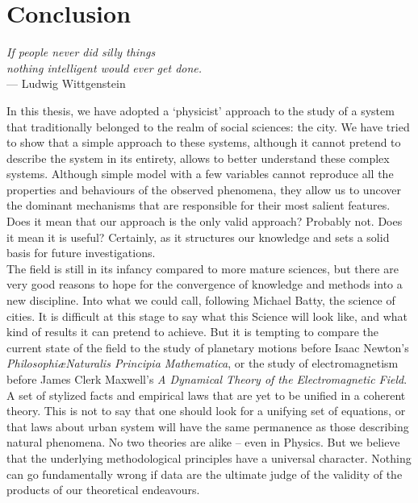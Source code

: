 %
\chapter{Conclusion}
\label{sec:conclusion}

\begin{flushright}{\slshape    
If people never did silly things\\
nothing intelligent would ever get done.} \\ \medskip
--- Ludwig Wittgenstein~\cite{Luckhardt:1979}
\end{flushright}

\bigskip

In this thesis, we have adopted a `physicist' approach to the study of a system
that traditionally belonged to the realm of social sciences: the city. We have
tried to show that a simple approach to these systems, although it cannot
pretend to describe the system in its entirety, allows to better understand
these complex systems. Although simple model with a few variables cannot
reproduce all the properties and behaviours of the observed phenomena, they
allow us to uncover the dominant mechanisms that are responsible for their most
salient features. Does it mean that our approach is the only valid approach?
Probably not. Does it mean it is useful? Certainly, as it structures
our knowledge and sets a solid basis for future investigations.\\

The field is still in its infancy compared to more mature sciences, but there
are very good reasons to hope for the convergence of knowledge and methods into
a new discipline. Into what we could call, following Michael Batty, the science of
cities. It is difficult at this stage to say what this Science will look like,
and what kind of results it can pretend to achieve. But it is tempting to
compare the current state of the field to the study of planetary motions
before Isaac Newton's \emph{Philosophi\ae Naturalis Principia Mathematica}, or
the study of electromagnetism before James Clerk Maxwell's \emph{A Dynamical
Theory of the Electromagnetic Field}. A set of stylized facts and empirical laws
that are yet to be unified in a coherent theory. This is not to say that one
should look for a unifying set of equations, or that laws about urban system
will have the same permanence as those describing natural phenomena. No two
theories are alike -- even in Physics. But we believe that the underlying
methodological principles have a universal character. Nothing can go
fundamentally wrong if data are the ultimate judge of the validity of the
products of our theoretical endeavours.



